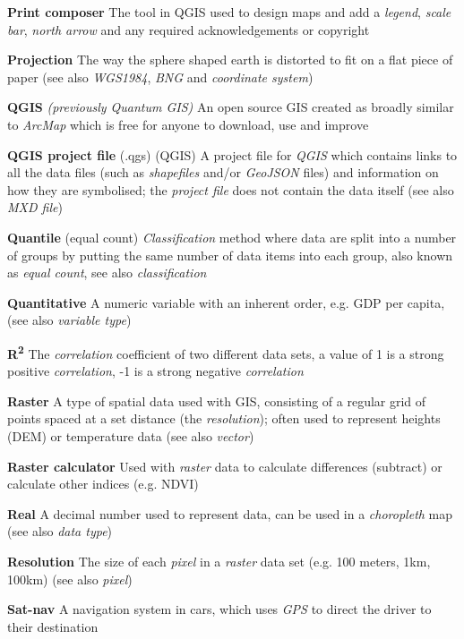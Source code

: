 \documentclass[a4paper,10pt]{article}
\begin{document}
\begin{multicols}{2}
\textbf{Print composer} The tool in QGIS used to design maps and add a \textit{legend}, \textit{scale bar}, \textit{north arrow} and any required acknowledgements or copyright  

\textbf{Projection} The way the sphere shaped earth is distorted to fit on a flat piece of paper (see also \textit{WGS1984}, \textit{BNG} and \textit{coordinate system})

\textbf{QGIS} \textit{(previously Quantum GIS)} An open source GIS created as broadly similar to \textit{ArcMap}  which is free for anyone to download, use and improve

\textbf{QGIS project file} (.qgs) (QGIS) A project file for \textit{QGIS} which contains links to all the data files (such as \textit{shapefiles} and/or \textit{GeoJSON} files) and information on how they are symbolised; the \textit{project file} does not contain the data itself (see also \textit{MXD file})

\textbf{Quantile} (equal count) \textit{Classification} method where data are split into a number of groups by putting the same number of data items into each group, also known as \textit{equal count}, see also \textit{classification}

\textbf{Quantitative} A numeric variable with an inherent order, e.g. GDP per capita, (see also \textit{variable type})

\textbf{R\textsuperscript{2}} The \textit{correlation} coefficient of two different data sets, a value of 1 is a strong positive \textit{correlation}, -1 is a strong negative \textit{correlation}

\textbf{Raster} A type of spatial data used with GIS, consisting of a regular grid of points spaced at a set distance (the \textit{resolution}); often used to represent heights (DEM) or temperature data (see also \textit{vector})

\textbf{Raster calculator} Used with \textit{raster} data to calculate differences (subtract) or calculate other indices (e.g. NDVI)

\textbf{Real} A decimal number used to represent data, can be used in a \textit{choropleth} map (see also \textit{data type}) 

\textbf{Resolution} The size of each \textit{pixel} in a \textit{raster} data set (e.g. 100 meters, 1km, 100km) (see also \textit{pixel}) 

\textbf{Sat-nav} A navigation system in cars, which uses \textit{GPS} to direct the driver to their destination


\end{multicols}
\end{document}
